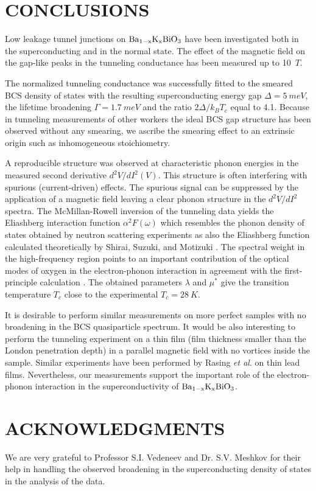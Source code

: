 \documentclass[twocolumn,amsmath,floats,showpacs,nofootinbib]{revtex4}
\begin{document}
\section{CONCLUSIONS}
Low leakage tunnel junctions on $\rm Ba_{1-x}K_xBiO_3$ have been investigated both in the superconducting and in the normal state. The effect of the magnetic field on the gap-like peaks in the tunneling conductance has been measured up to 10~$T$.

The normalized tunneling conductance was successfully fitted to the smeared BCS density of states with the resulting superconducting energy gap $\Delta=5\ meV$, the lifetime broadening $\Gamma=1.7\ meV$ and the ratio $2\Delta /k_BT_c$ equal to 4.1. Because in tunneling measurements of other workers \cite{7,8,9} the ideal BCS gap structure has been observed without any smearing, we ascribe the smearing effect to an extrinsic origin such as inhomogeneous stoichiometry.

A reproducible structure was observed at characteristic phonon energies in the measured second derivative $d^2V/dI^2(V)$. This structure is often interfering with spurious (current-driven) effects. The spurious signal can be suppressed by the application of a magnetic field leaving a clear phonon structure in the $d^2V/dI^2$ spectra. The McMillan-Rowell inversion of the tunneling data yields the Eliashberg interaction function $\alpha^2F(\omega)$ which resembles the phonon density of states obtained by neutron scattering experiments \cite{13} as also the Eliashberg function calculated theoretically by Shirai, Suzuki, and Motizuki \cite{12}. The spectral weight in the high-frequency region points to an important contribution of the optical modes of oxygen in the electron-phonon interaction in agreement with the first-principle calculation \cite{12}. The obtained parameters $\lambda$ and $\mu^*$ give the transition temperature $T_c$ close to the experimental $T_c =28\ K$.

It is desirable to perform similar measurements on more perfect samples with no broadening in the BCS quasiparticle spectrum. It would be also interesting to perform the tunneling experiment on a thin film (film thickness smaller than the London penetration depth) in a parallel magnetic field with no vortices inside the sample. Similar experiments have been performed by Rasing \emph{et al}. \cite{19} on thin lead films. Nevertheless, our measurements support the important role of the electron-phonon interaction in the superconductivity of $\rm Ba_{1-x}K_xBiO_3$.
\section{ACKNOWLEDGMENTS}
We are very grateful to Professor S.I. Vedeneev and Dr. S.V. Meshkov for their help in handling the observed broadening in the superconducting density of states in the analysis of the data.
\end{document}
